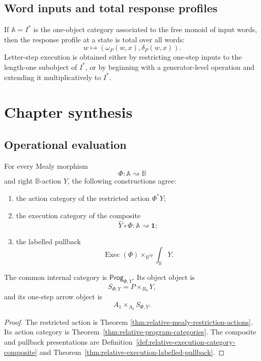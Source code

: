 \subsection{Word inputs and total response profiles}
\label{subsec:poly-relative-example-words}

If \(\mathbb A=I^\ast\) is the one-object category associated to the free
monoid of input words, then the response profile at a state is total over all
words:
\[
w\longmapsto
\left(
\omega_P(w,x),
\delta_P(w,x)
\right).
\]
Letter-step execution is obtained either by restricting one-step inputs to
the length-one subobject of \(I^\ast\), or by beginning with a generator-level
operation and extending it multiplicatively to \(I^\ast\).


\section{Chapter synthesis}
\label{sec:relative-response-synthesis}

\subsection{Operational evaluation}
\label{subsec:relative-response-operational-summary}

\begin{theorem}
\label{thm:relative-response-operational-summary}
For every Mealy morphism
\[
    \Phi:\mathbb A\rightsquigarrow\mathbb B
\]
and right \(\mathbb B\)-action \(Y\), the following constructions agree:
\begin{enumerate}
    \item the action category of the restricted action \(\Phi^{\ast}Y\);
    \item the execution category of the composite
    \[
        \widehat Y\circ\Phi:\mathbb A\rightsquigarrow\mathbf 1;
    \]
    \item the labelled pullback
    \[
        \operatorname{Exec}(\Phi)
        \times_{\mathbb B^{\mathrm{op}}}
        \int_{\mathbb B}Y.
    \]
\end{enumerate}
The common internal category is \(\mathsf{Prog}_{\Phi,Y}\).  Its object
object is
\[
    S_{\Phi,Y}=P\times_{B_0}Y,
\]
and its one-step arrow object is
\[
    A_1\times_{A_0}S_{\Phi,Y}.
\]
\end{theorem}

\begin{proof}
The restricted action is Theorem
\ref{thm:relative-mealy-restriction-actions}.  Its action category is
Theorem~\ref{thm:relative-program-categories}.  The composite and pullback
presentations are Definition~\ref{def:relative-execution-category-composite}
and Theorem~\ref{thm:relative-execution-labelled-pullback}.
\end{proof}


